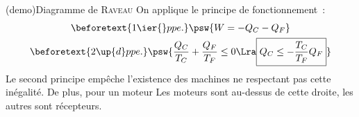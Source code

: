 \documentclass[../../main/main.tex]{subfiles}
\begin{document}
\begin{tcb*}[sidebyside, righthand ratio=.45](demo){Diagramme de \textsc{Raveau}}
	On applique le principe de fonctionnement~:
	\begin{gather*}
		\beforetext{1\ier{} ppe.}
		\psw{W = -Q_C - Q_F}
		\\\beforetext{2\up{d} ppe.}
		\psw{%
			\frac{Q_C}{T_C} + \frac{Q_F}{T_F} \leq 0
			\Lra
			\boxed{Q_C \leq - \frac{T_C}{T_F} Q_F}
		}%
	\end{gather*}
	Le second principe empêche l'existence des machines ne respectant pas cette
	inégalité. De plus, pour un moteur
	Les moteurs sont au-dessus de cette droite, les autres sont récepteurs.
	\tcblower
	\begin{center}
		\vspace{-15pt}
	\end{center}
\end{tcb*}
\end{document}
